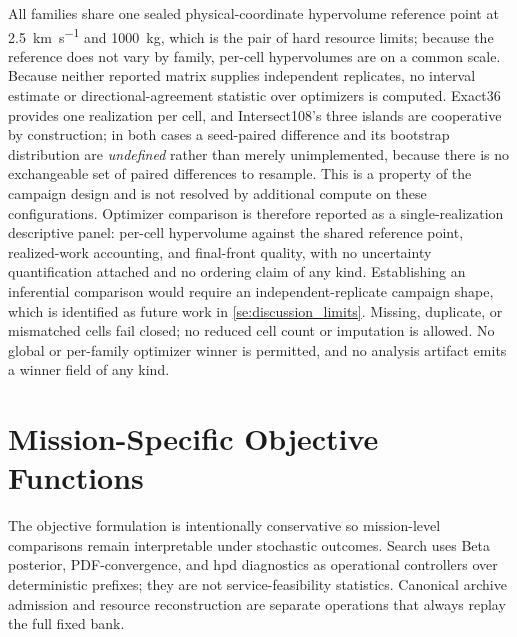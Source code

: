         All families share one sealed physical-coordinate hypervolume reference point at \SI{2.5}{\kilo\metre\per\second} and \SI{1000}{\kilogram}, which is the pair of hard resource limits; because the reference does not vary by family, per-cell hypervolumes are on a common scale. Because neither reported matrix supplies independent replicates, no interval estimate or directional-agreement statistic over optimizers is computed. Exact36 provides one realization per cell, and Intersect108's three islands are cooperative by construction; in both cases a seed-paired difference and its bootstrap distribution are \emph{undefined} rather than merely unimplemented, because there is no exchangeable set of paired differences to resample. This is a property of the campaign design and is not resolved by additional compute on these configurations. Optimizer comparison is therefore reported as a single-realization descriptive panel: per-cell hypervolume against the shared reference point, realized-work accounting, and final-front quality, with no uncertainty quantification attached and no ordering claim of any kind. Establishing an inferential comparison would require an independent-replicate campaign shape, which is identified as future work in \cref{se:discussion_limits}. Missing, duplicate, or mismatched cells fail closed; no reduced cell count or imputation is allowed. No global or per-family optimizer winner is permitted, and no analysis artifact emits a winner field of any kind.

    \clearpage
\section{Mission-Specific Objective Functions} \label{se:objectives}
    The objective formulation is intentionally conservative so mission-level comparisons remain interpretable under stochastic outcomes. Search uses Beta posterior, PDF-convergence, and \gls{hpd} diagnostics as operational controllers over deterministic prefixes; they are not service-feasibility statistics. Canonical archive admission and resource reconstruction are separate operations that always replay the full fixed bank.

